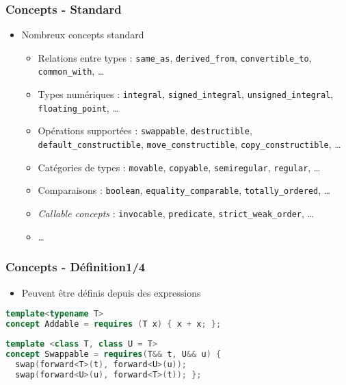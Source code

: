 \documentclass[C++.tex]{subfiles}
\begin{document}
\begin{frame}[fragile]
	\frametitle{Concepts - Standard}
	\begin{itemize}
		\item Nombreux concepts standard


		\begin{itemize}
			\item Relations entre types : \lstinline|same_as|, \lstinline|derived_from|, \lstinline|convertible_to|, \lstinline|common_with|, \ldots
			\item Types numériques : \lstinline|integral|, \lstinline|signed_integral|, \lstinline|unsigned_integral|, \lstinline|floating_point|, \ldots
			\item Opérations supportées : \lstinline|swappable|, \lstinline|destructible|, \lstinline|default_constructible|, \lstinline|move_constructible|, \lstinline|copy_constructible|, \ldots
			\item Catégories de types : \lstinline|movable|, \lstinline|copyable|, \lstinline|semiregular|, \lstinline|regular|, \ldots


			\item Comparaisons : \lstinline|boolean|, \lstinline|equality_comparable|, \lstinline|totally_ordered|, \ldots
			\item \textit{Callable concepts} : \lstinline|invocable|, \lstinline|predicate|, \lstinline|strict_weak_order|, \ldots


			\item \ldots
		\end{itemize}
	\end{itemize}
\end{frame}

\begin{frame}[fragile]
	\frametitle{Concepts - Définition\titlehfill{}1/4}
	\begin{itemize}
		\item Peuvent être définis depuis des expressions
	\end{itemize}

	\begin{lstlisting}[language=C++]
template<typename T>
concept Addable = requires (T x) { x + x; };\end{lstlisting}

	\begin{lstlisting}[language=C++]
template <class T, class U = T>
concept Swappable = requires(T&& t, U&& u) {
  swap(forward<T>(t), forward<U>(u));
  swap(forward<U>(u), forward<T>(t)); };\end{lstlisting}
\end{frame}
\end{document}
